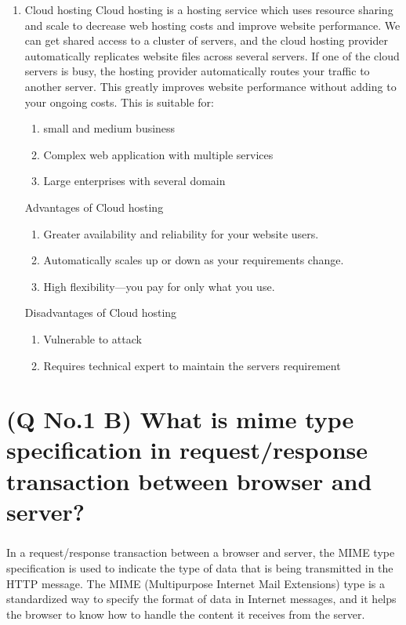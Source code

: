\documentclass[11pt]{article}
\begin{document}
\begin{enumerate}
    \item Cloud hosting
    Cloud hosting is a hosting service which uses resource sharing and scale to decrease web hosting costs and improve website performance. We can get shared access to a cluster of servers, and the cloud hosting provider automatically replicates website files across several servers. If one of the cloud servers is busy, the hosting provider automatically routes your traffic to another server. This greatly improves website performance without adding to your ongoing costs. 
    This is suitable for:
    \begin{enumerate}
        \item small and medium business
        \item Complex web application with multiple services
        \item Large enterprises with several domain
    \end{enumerate}
    \subitem Advantages of Cloud hosting
    \begin{enumerate}
        \item Greater availability and reliability for your website users.
        \item Automatically scales up or down as your requirements change.
        \item High flexibility—you pay for only what you use.
    \end{enumerate}
    \subitem Disadvantages of Cloud hosting
    \begin{enumerate}
        \item Vulnerable to attack
        \item Requires technical expert to maintain the servers requirement
    \end{enumerate}
\end{enumerate}


\pagebreak
\section{(Q No.1 B) What is mime type specification in request/response transaction between browser and server?}
\subparagraph{}
In a request/response transaction between a browser and server, the MIME type specification is used to indicate the type of data that is being transmitted in the HTTP message. The MIME (Multipurpose Internet Mail Extensions) type is a standardized way to specify the format of data in Internet messages, and it helps the browser to know how to handle the content it receives from the server.
\end{document}
